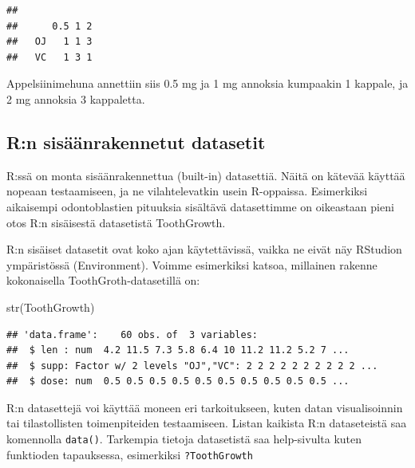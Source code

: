\documentclass[
]{book}
\newenvironment{Shaded}{\begin{snugshade}}{\end{snugshade}}
\newcommand{\FunctionTok}[1]{\textcolor[rgb]{0.00,0.00,0.00}{#1}}
\newcommand{\NormalTok}[1]{#1}
\newcommand{\SpecialCharTok}[1]{\textcolor[rgb]{0.00,0.00,0.00}{#1}}
\begin{document}
\begin{Shaded}
\end{Shaded}

\begin{verbatim}
##     
##      0.5 1 2
##   OJ   1 1 3
##   VC   1 3 1
\end{verbatim}

Appelsiinimehuna annettiin siis 0.5 mg ja 1 mg annoksia kumpaakin 1 kappale, ja 2 mg annoksia 3 kappaletta.

\hypertarget{rn-sisuxe4uxe4nrakennetut-datasetit}{%
\subsection{R:n sisäänrakennetut datasetit}\label{rn-sisuxe4uxe4nrakennetut-datasetit}}

R:ssä on monta sisäänrakennettua (built-in) datasettiä. Näitä on kätevää käyttää nopeaan testaamiseen, ja ne vilahtelevatkin usein R-oppaissa. Esimerkiksi aikaisempi odontoblastien pituuksia sisältävä datasettimme on oikeastaan pieni otos R:n sisäisestä datasetistä ToothGrowth.

R:n sisäiset datasetit ovat koko ajan käytettävissä, vaikka ne eivät näy RStudion ympäristössä (Environment). Voimme esimerkiksi katsoa, millainen rakenne kokonaisella ToothGroth-datasetillä on:

\begin{Shaded}
\begin{Highlighting}[]
\FunctionTok{str}\NormalTok{(ToothGrowth)}
\end{Highlighting}
\end{Shaded}

\begin{verbatim}
## 'data.frame':    60 obs. of  3 variables:
##  $ len : num  4.2 11.5 7.3 5.8 6.4 10 11.2 11.2 5.2 7 ...
##  $ supp: Factor w/ 2 levels "OJ","VC": 2 2 2 2 2 2 2 2 2 2 ...
##  $ dose: num  0.5 0.5 0.5 0.5 0.5 0.5 0.5 0.5 0.5 0.5 ...
\end{verbatim}

R:n datasettejä voi käyttää moneen eri tarkoitukseen, kuten datan visualisoinnin tai tilastollisten toimenpiteiden testaamiseen. Listan kaikista R:n dataseteistä saa komennolla \texttt{data()}. Tarkempia tietoja datasetistä saa help-sivulta kuten funktioden tapauksessa, esimerkiksi \texttt{?ToothGrowth}
\end{document}
